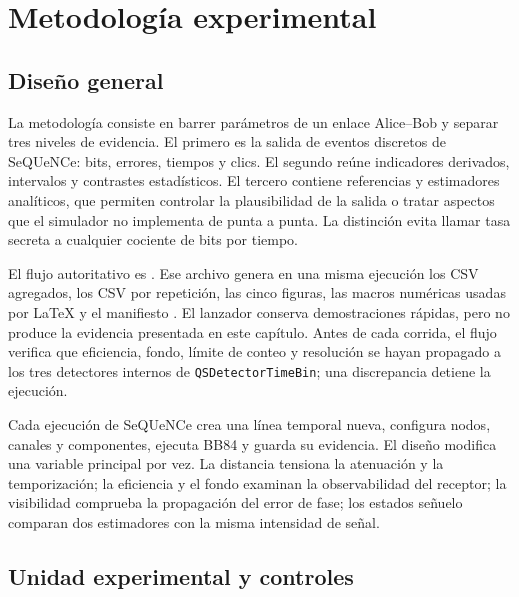 \chapter{Metodología experimental}
\label{chap:metodologia}

\section{Diseño general}

La metodología consiste en barrer parámetros de un enlace Alice--Bob y separar tres niveles de evidencia. El primero es la salida de eventos discretos de SeQUeNCe: bits, errores, tiempos y clics. El segundo reúne indicadores derivados, intervalos y contrastes estadísticos. El tercero contiene referencias y estimadores analíticos, que permiten controlar la plausibilidad de la salida o tratar aspectos que el simulador no implementa de punta a punta. La distinción evita llamar tasa secreta a cualquier cociente de bits por tiempo.

El flujo autoritativo es . Ese archivo genera en una misma ejecución los CSV agregados, los CSV por repetición, las cinco figuras, las macros numéricas usadas por LaTeX y el manifiesto . El lanzador  conserva demostraciones rápidas, pero no produce la evidencia presentada en este capítulo. Antes de cada corrida, el flujo verifica que eficiencia, fondo, límite de conteo y resolución se hayan propagado a los tres detectores internos de \texttt{QSDetectorTimeBin}; una discrepancia detiene la ejecución.

Cada ejecución de SeQUeNCe crea una línea temporal nueva, configura nodos, canales y componentes, ejecuta BB84 y guarda su evidencia. El diseño modifica una variable principal por vez. La distancia tensiona la atenuación y la temporización; la eficiencia y el fondo examinan la observabilidad del receptor; la visibilidad comprueba la propagación del error de fase; los estados señuelo comparan dos estimadores con la misma intensidad de señal.

\section{Unidad experimental y controles}

